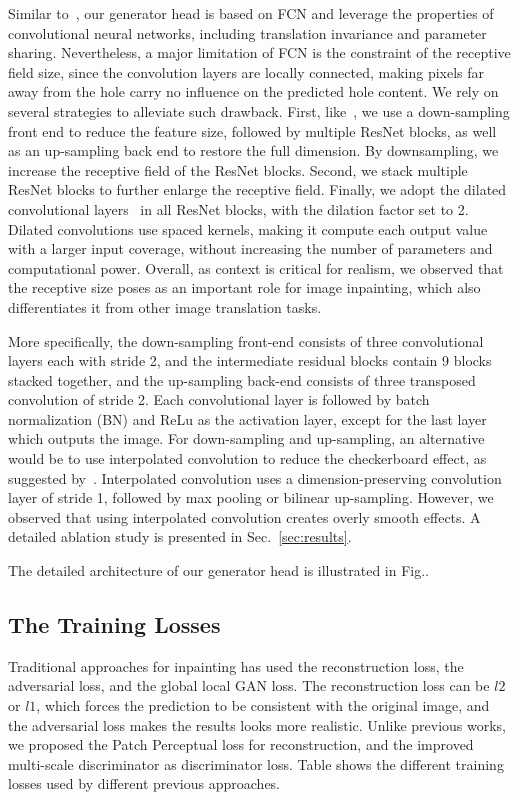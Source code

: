 Similar to~\cite{iizuka2017globally}, our generator head is based on FCN and leverage the properties of convolutional neural networks, including translation invariance and parameter sharing. Nevertheless, a major limitation of FCN is the constraint of the receptive field size, since the convolution layers are locally connected, making pixels far away from the hole carry no influence on the predicted hole content. We rely on several strategies to alleviate such drawback. First, like~\cite{iizuka2017globally}, we use a down-sampling front end to reduce the feature size, followed by multiple ResNet blocks, as well as an up-sampling back end to restore the full dimension. By downsampling, we increase the receptive field of the ResNet blocks. Second, we stack multiple ResNet blocks to further enlarge the receptive field. Finally, we adopt the dilated convolutional layers~\cite{yu2015multi} in all ResNet blocks, with the dilation factor set to 2. Dilated convolutions use spaced kernels, making it compute each output value with a larger input coverage, without increasing the number of parameters and computational power. Overall, as context is critical for realism, we observed that the receptive size poses as an important role for image inpainting, which also differentiates it from other image translation tasks. 

More specifically, the down-sampling front-end consists of three convolutional layers each with stride 2, and the intermediate residual blocks contain 9 blocks stacked together, and the up-sampling back-end consists of three transposed convolution of stride 2. Each convolutional layer is followed by batch normalization (BN) and ReLu as the activation layer, except for the last layer which outputs the image. For down-sampling and up-sampling, an alternative would be to use interpolated convolution to reduce the checkerboard effect, as suggested by~\cite{odena2016deconvolution}. Interpolated convolution uses a dimension-preserving convolution layer of stride 1, followed by max pooling or bilinear up-sampling. However, we observed that using interpolated convolution creates overly smooth effects. A detailed ablation study is presented in Sec.~\ref{sec:results}.

The detailed architecture of our generator head is illustrated in Fig..

\subsection{The Training Losses}
Traditional approaches for inpainting has used the reconstruction loss, the adversarial loss, and the global local GAN loss. The reconstruction loss can be $l2$ or $l1$, which forces the prediction to be consistent with the original image, and the adversarial loss makes the results looks more realistic. Unlike previous works, we proposed the Patch Perceptual loss for reconstruction, and the improved multi-scale discriminator as discriminator loss. Table shows the different training losses used by different previous approaches.


